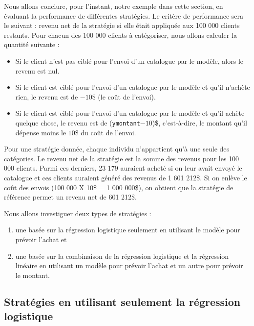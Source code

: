 \documentclass[
  11pt,
  letterpaper,
]{book}
\providecommand{\tightlist}{%
  \setlength{\itemsep}{0pt}\setlength{\parskip}{0pt}}
\theoremstyle{definition}
\theoremstyle{definition}
\theoremstyle{definition}
\theoremstyle{definition}
\theoremstyle{remark}
\begin{document}
Nous allons conclure, pour l'instant, notre exemple dans cette section, en évaluant la performance de différentes stratégies. Le critère de performance sera le suivant : revenu net de la stratégie si elle était appliquée aux 100 000 clients restants. Pour chacun des 100 000 clients à catégoriser, nous allons calculer la quantité suivante :

\begin{itemize}
\tightlist
\item
  Si le client n'est pas ciblé pour l'envoi d'un catalogue par le modèle, alors le revenu est nul.
\item
  Si le client est ciblé pour l'envoi d'un catalogue par le modèle et qu'il n'achète rien, le revenu est de \(-10\)\$ (le coût de l'envoi).
\item
  Si le client est ciblé pour l'envoi d'un catalogue par le modèle et qu'il achète quelque chose, le revenu est de (\texttt{ymontant}\(-10\))\$, c'est-à-dire, le montant qu'il dépense moins le \(10\)\$ du coût de l'envoi.
\end{itemize}

Pour une stratégie donnée, chaque individu n'appartient qu'à une seule des catégories. Le revenu net de la stratégie est la somme des revenus pour les 100 000 clients. Parmi ces derniers, 23 179 auraient acheté si on leur avait envoyé le catalogue et ces clients auraient généré des revenus de 1 601 212\$. Si on enlève le coût des envois (100 000 X 10\$ = 1 000 000\$), on obtient que la stratégie de référence permet un revenu net de 601 212\$.

Nous allons investiguer deux types de stratégies :

\begin{enumerate}
\def\labelenumi{\arabic{enumi})}
\tightlist
\item
  une basée sur la régression logistique seulement en utilisant le modèle pour prévoir l'achat et
\item
  une basée sur la combinaison de la régression logistique et la régression linéaire en utilisant un modèle pour prévoir l'achat et un autre pour prévoir le montant.
\end{enumerate}

\hypertarget{stratuxe9gies-en-utilisant-seulement-la-ruxe9gression-logistique}{%
\subsection{Stratégies en utilisant seulement la régression logistique}\label{stratuxe9gies-en-utilisant-seulement-la-ruxe9gression-logistique}}
\end{document}
